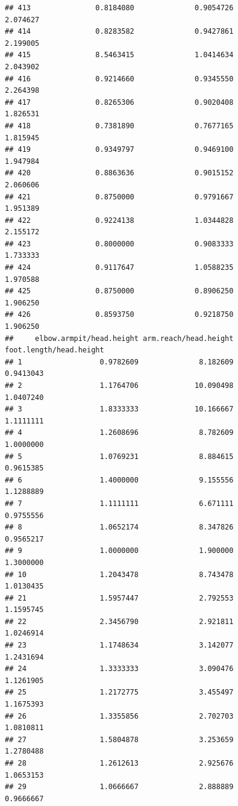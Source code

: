 \documentclass[]{article}
\begin{document}
\begin{verbatim}
## 413               0.8184080              0.9054726               2.074627
## 414               0.8283582              0.9427861               2.199005
## 415               8.5463415              1.0414634               2.043902
## 416               0.9214660              0.9345550               2.264398
## 417               0.8265306              0.9020408               1.826531
## 418               0.7381890              0.7677165               1.815945
## 419               0.9349797              0.9469100               1.947984
## 420               0.8863636              0.9015152               2.060606
## 421               0.8750000              0.9791667               1.951389
## 422               0.9224138              1.0344828               2.155172
## 423               0.8000000              0.9083333               1.733333
## 424               0.9117647              1.0588235               1.970588
## 425               0.8750000              0.8906250               1.906250
## 426               0.8593750              0.9218750               1.906250
##     elbow.armpit/head.height arm.reach/head.height foot.length/head.height
## 1                  0.9782609              8.182609               0.9413043
## 2                  1.1764706             10.090498               1.0407240
## 3                  1.8333333             10.166667               1.1111111
## 4                  1.2608696              8.782609               1.0000000
## 5                  1.0769231              8.884615               0.9615385
## 6                  1.4000000              9.155556               1.1288889
## 7                  1.1111111              6.671111               0.9755556
## 8                  1.0652174              8.347826               0.9565217
## 9                  1.0000000              1.900000               1.3000000
## 10                 1.2043478              8.743478               1.0130435
## 21                 1.5957447              2.792553               1.1595745
## 22                 2.3456790              2.921811               1.0246914
## 23                 1.1748634              3.142077               1.2431694
## 24                 1.3333333              3.090476               1.1261905
## 25                 1.2172775              3.455497               1.1675393
## 26                 1.3355856              2.702703               1.0810811
## 27                 1.5804878              3.253659               1.2780488
## 28                 1.2612613              2.925676               1.0653153
## 29                 1.0666667              2.888889               0.9666667

\end{verbatim}
\end{document}
